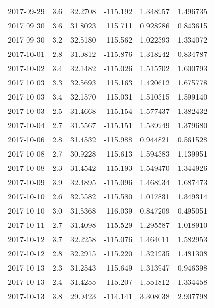 \begin{tabular}{lrrrrr}
2017-09-29 &       3.6 &  32.2708 &  -115.192 &         1.348957 &         1.496735 \\
2017-09-30 &       3.6 &  31.8023 &  -115.711 &         0.928286 &         0.843615 \\
2017-09-30 &       3.2 &  32.5180 &  -115.562 &         1.022393 &         1.334072 \\
2017-10-01 &       2.8 &  31.0812 &  -115.876 &         1.318242 &         0.834787 \\
2017-10-02 &       3.4 &  32.1482 &  -115.026 &         1.515702 &         1.600793 \\
2017-10-03 &       3.3 &  32.5693 &  -115.163 &         1.420612 &         1.675778 \\
2017-10-03 &       3.4 &  32.1570 &  -115.031 &         1.510315 &         1.599140 \\
2017-10-03 &       2.5 &  31.4668 &  -115.154 &         1.577437 &         1.382432 \\
2017-10-04 &       2.7 &  31.5567 &  -115.151 &         1.539249 &         1.379680 \\
2017-10-06 &       2.8 &  31.4532 &  -115.988 &         0.944821 &         0.561528 \\
2017-10-08 &       2.7 &  30.9228 &  -115.613 &         1.594383 &         1.139951 \\
2017-10-08 &       2.3 &  31.4542 &  -115.193 &         1.549470 &         1.344926 \\
2017-10-09 &       3.9 &  32.4895 &  -115.096 &         1.468934 &         1.687473 \\
2017-10-10 &       2.6 &  32.5582 &  -115.580 &         1.017831 &         1.349314 \\
2017-10-10 &       3.0 &  31.5368 &  -116.039 &         0.847209 &         0.495051 \\
2017-10-11 &       2.7 &  31.4098 &  -115.529 &         1.295587 &         1.018910 \\
2017-10-12 &       3.7 &  32.2258 &  -115.076 &         1.464011 &         1.582953 \\
2017-10-12 &       2.8 &  32.2915 &  -115.220 &         1.321935 &         1.481308 \\
2017-10-13 &       2.3 &  31.2543 &  -115.649 &         1.313947 &         0.946398 \\
2017-10-13 &       2.4 &  31.4255 &  -115.207 &         1.551812 &         1.334458 \\
2017-10-13 &       3.8 &  29.9423 &  -114.141 &         3.308038 &         2.907798 \\

\end{tabular}
